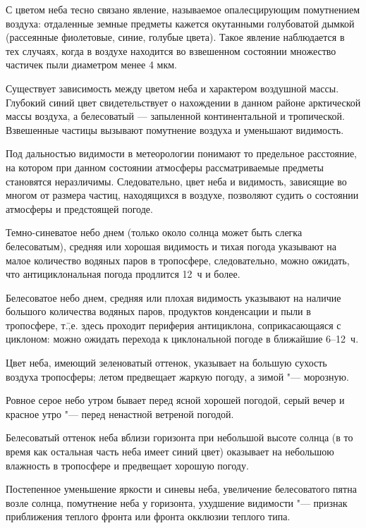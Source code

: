 С цветом неба тесно связано явление, называемое опалесцирующим
помутнением воздуха: отдаленные земные предметы кажется окутанными
голубоватой дымкой (рассеянные фиолетовые, синие, голубые
цвета). Такое явление наблюдается в тех случаях, когда в воздухе
находится во взвешенном состоянии множество частичек пыли диаметром
менее 4 мкм.

Существует зависимость между цветом неба и характером воздушной
массы. Глубокий синий цвет свидетельствует о нахождении в данном
районе арктической массы воздуха, а белесоватый — запыленной
континентальной и тропической. Взвешенные частицы вызывают помутнение
воздуха и уменьшают видимость.

Под дальностью видимости в метеорологии понимают то предельное
расстояние, на котором при данном состоянии атмосферы рассматриваемые
предметы становятся неразличимы. Следовательно, цвет неба и видимость,
зависящие во многом от размера частиц, находящихся в воздухе,
позволяют судить о состоянии атмосферы и предстоящей погоде.

 Темно-синеватое небо днем (только около солнца может быть
слегка белесоватым), средняя или хорошая видимость и тихая погода
указывают на малое количество водяных паров в тропосфере,
следовательно, можно ожидать, что антициклональная погода продлится
12~ч и более.

 Белесоватое небо днем, средняя или плохая видимость указывают
на наличие большого количества водяных паров, продуктов конденсации и
пыли в тропосфере, т.\=,е. здесь проходит периферия антициклона,
соприкасающаяся с циклоном: можно ожидать перехода к циклональной
погоде в ближайшие 6--12~ч.

 Цвет неба, имеющий зеленоватый оттенок, указывает на большую
сухость воздуха тропосферы; летом предвещает жаркую погоду, а зимой "---
морозную.

 Ровное серое небо утром бывает перед ясной хорошей погодой,
серый вечер и красное утро "--- перед ненастной ветреной погодой.

 Белесоватый оттенок неба вблизи горизонта при небольшой высоте
солнца (в то время как остальная часть неба имеет синий цвет)
оказывает на небольшою влажность в тропосфере и предвещает хорошую
погоду.

 Постепенное уменьшение яркости и синевы неба, увеличение
белесоватого пятна возле солнца, помутнение неба у горизонта,
ухудшение видимости "--- признак приближения теплого фронта или фронта
окклюзии теплого типа.

